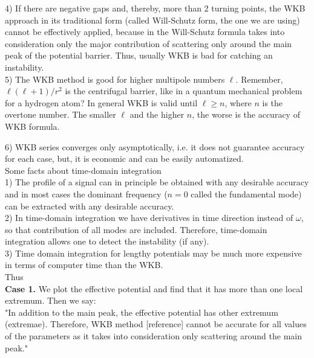 \documentclass[10pt]{article}
\begin{document}
4) If there are negative gaps and, thereby, more than 2 turning points, the WKB approach in its traditional form (called Will-Schutz form, the one we are using) cannot be effectively applied, because in the Will-Schutz formula takes into consideration only the major contribution of scattering only around the main peak of the potential barrier. Thus, usually WKB is bad for catching an instability.\\

5) The WKB method is good for higher multipole numbers $\ell$. Remember, $\ell (\ell +1)/r^2$ is the centrifugal barrier, like in a quantum mechanical problem for a hydrogen atom? In general WKB is valid until $\ell \geq n$, where $n$ is the overtone number. The smaller $\ell$ and the higher $n$, the worse is the accuracy of WKB formula.

6) WKB series converges only asymptotically, i.e. it does not guarantee accuracy for each case, but, it is economic and can be easily automatized.\\ 


Some facts about time-domain integration\\

1) The profile of a signal can in principle be obtained with any desirable accuracy and in most cases the dominant frequency ($n=0$ called the fundamental mode) can be extracted with any desirable accuracy. \\

2) In time-domain integration we have derivatives in time direction instead of $\omega$, so that contribution of all modes are included. Therefore, time-domain integration allows one to detect the instability (if any).\\

3) Time domain integration for lengthy potentials may be much more expensive in terms of computer time than the WKB.\\


Thus\\

\textbf{Case 1.} We plot the effective potential and find that it has more than one local extremum. Then we say:\\

"In addition to the main peak, the effective potential has other extremum (extremae). Therefore, WKB method [reference] cannot be accurate for all values of the parameters as it takes into consideration only scattering around the main peak."\\
\end{document}
